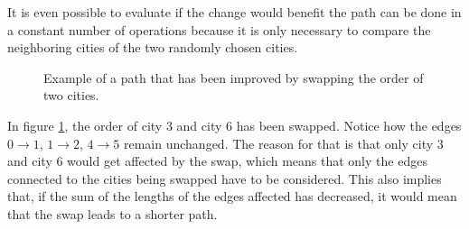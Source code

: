 \documentclass{article}
\begin{document}
\noindent
It is even possible to evaluate if the change would benefit the path can be done in a constant number of operations because it is only necessary to compare the neighboring cities of the two randomly chosen cities.
\begin{figure}[ht]
     \centering
     \caption{Example of a path that has been improved by swapping the order of two cities.}
     \label{Figure:Swapping}
\end{figure}

\noindent
In figure \ref{Figure:Swapping}, the order of city $3$ and city $6$ has been swapped. Notice how the edges $0 \rightarrow 1$, $1 \rightarrow 2$, $4 \rightarrow 5$ remain unchanged. The reason for that is that only city $3$ and city $6$ would get affected by the swap, which means that only the edges connected to the cities being swapped have to be considered. This also implies that, if the sum of the lengths of the edges affected has decreased, it would mean that the swap leads to a shorter path.

 
\end{document}
